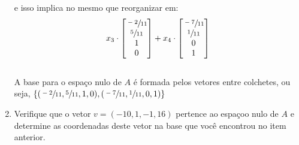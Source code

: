 \begin{enumerate}
          e isso implica no mesmo que reorganizar em:
          \\

          \[
              x_3 \cdot
              \begin{bmatrix}
                  \sfrac{-2}{11} \\
                  \sfrac{5}{11}  \\
                  1              \\
                  0
              \end{bmatrix} +
              x_4 \cdot
              \begin{bmatrix}
                  \sfrac{-7}{11} \\
                  \sfrac{1}{11}  \\
                  0              \\
                  1
              \end{bmatrix}
          \]
          \\

          A base para o espaço nulo de $A$ é formada pelos vetores entre colchetes, ou seja, $\{(\sfrac{-2}{11}, \sfrac{5}{11},1,0),(\sfrac{-7}{11},\sfrac{1}{11},0,1)\}$\\

    \item Verifique que o vetor $v = (-10, 1, -1, 16)$ pertence ao espaçoo nulo de $A$ e determine as coordenadas deste vetor na base que você encontrou no item anterior.

\end{enumerate}
